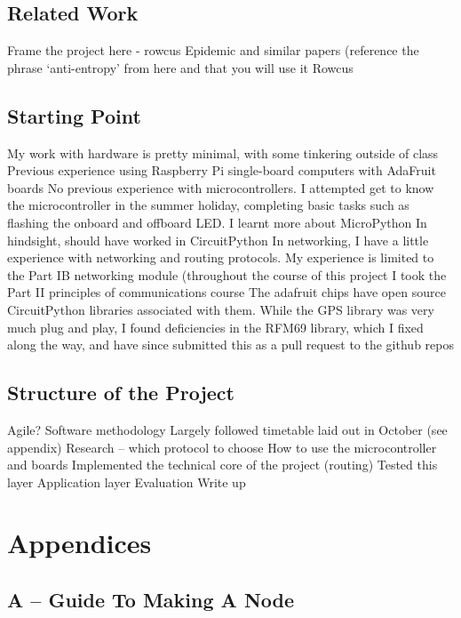 \documentclass[12pt,a4paper]{report}
\begin{document}
\section{Related Work}	
Frame the project here - rowcus 
Epidemic and similar papers (reference the phrase `anti-entropy' from here and that you will use it
Rowcus 

\section{Starting Point}	
My work with hardware is pretty minimal, with some tinkering outside of class
Previous experience using Raspberry Pi single-board computers with AdaFruit boards
No previous experience with microcontrollers. 
I attempted get to know the microcontroller in the summer holiday, completing basic tasks such as flashing the onboard and offboard LED. I learnt more about MicroPython 
In hindsight, should have worked in CircuitPython
In networking, I have a little experience with networking and routing protocols. My experience is limited to the Part IB networking module (throughout the course of this project I took the Part II principles of communications course
The adafruit chips have open source CircuitPython libraries associated with them. While the GPS library was very much plug and play, I found deficiencies in the RFM69 library, which I fixed along the way, and have since submitted this as a pull request to the github repos

\section{Structure of the Project}	
Agile? Software methodology
Largely followed timetable laid out in October (see appendix)
Research -- which protocol to choose
How to use the microcontroller and boards
Implemented the technical core of the project (routing) 
Tested this layer
Application layer
Evaluation
Write up




%


\chapter*{Appendices}

\section*{A -- Guide To Making A Node}
\setcounter{section}{0}
\setcounter{figure}{0}
\end{document}
